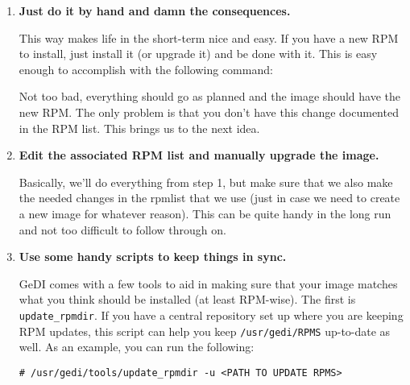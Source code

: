 \documentclass[10pt,a4paper,titlepage]{article}
\begin{document}
\begin{enumerate}
\item {\bfseries Just do it by hand and damn the consequences.}

This way makes life in the short-term nice and easy.  If you have a new RPM to
install, just install it (or upgrade it) and be done with it.  This is easy
enough to accomplish with the following command:


Not too bad, everything should go as planned and the image should have the new
RPM.  The only problem is that you don't have this change documented in the
RPM list.  This brings us to the next idea.

\item {\bfseries Edit the associated RPM list and manually upgrade the image.}

Basically, we'll do everything from step 1, but make sure that we also make the
needed changes in the rpmlist that we use (just in case we need to create a new
image for whatever reason).  This can be quite handy in the long run and not
too difficult to follow through on.

\item {\bfseries Use some handy scripts to keep things in sync.}

GeDI comes with a few tools to aid in making sure that your image matches what
you think should be installed (at least RPM-wise).  The first is
\verb!update_rpmdir!.  If you have a central repository set up where you are
keeping RPM updates, this script can help you keep \verb!/usr/gedi/RPMS!
up-to-date as well.  As an example, you can run the following:

\begin{verbatim}
# /usr/gedi/tools/update_rpmdir -u <PATH TO UPDATE RPMS>
\end{verbatim}


\end{enumerate}
\end{document}

